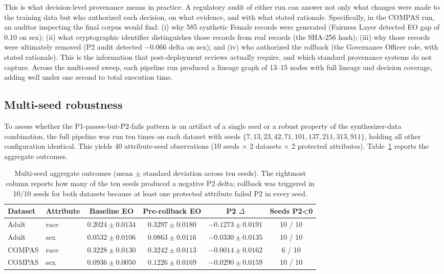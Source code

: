 \documentclass[11pt]{article}
\begin{document}
This is what decision-level provenance means in practice. A regulatory audit of either run can answer not only what changes were made to the training data but who authorized each decision, on what evidence, and with what stated rationale. Specifically, in the COMPAS run, an auditor inspecting the final corpus would find: (i) why 585 synthetic Female records were generated (Fairness Layer detected EO gap of 0.10 on sex); (ii) what cryptographic identifier distinguishes those records from real records (the SHA-256 hash); (iii) why those records were ultimately removed (P2 audit detected $-0.066$ delta on sex); and (iv) who authorized the rollback (the Governance Officer role, with stated rationale). This is the information that post-deployment reviews actually require, and which standard provenance systems do not capture. Across the multi-seed sweep, each pipeline run produced a lineage graph of 13--15 nodes with full lineage and decision coverage, adding well under one second to total execution time.

\subsection{Multi-seed robustness}
\label{subsec:multiseed}

To assess whether the P1-passes-but-P2-fails pattern is an artifact of a single seed or a robust property of the synthesizer-data combination, the full pipeline was run ten times on each dataset with seeds $\{7, 13, 23, 42, 71, 101, 137, 211, 313, 911\}$, holding all other configuration identical. This yields 40 attribute-seed observations (10 seeds $\times$ 2 datasets $\times$ 2 protected attributes). Table~\ref{tab:multiseed} reports the aggregate outcomes.

\begin{table}[h]
\centering
\small
\caption{Multi-seed aggregate outcomes (mean $\pm$ standard deviation across ten seeds). The rightmost column reports how many of the ten seeds produced a negative P2 delta; rollback was triggered in 10/10 seeds for both datasets because at least one protected attribute failed P2 in every seed.}
\label{tab:multiseed}
\begin{tabular}{llcccc}
\toprule
\textbf{Dataset} & \textbf{Attribute} & \textbf{Baseline EO} & \textbf{Pre-rollback EO} & \textbf{P2 $\Delta$} & \textbf{Seeds P2{<}0} \\
\midrule
Adult  & race & $0.2024 \pm 0.0134$ & $0.3297 \pm 0.0180$ & $-0.1273 \pm 0.0191$ & 10 / 10 \\
Adult  & sex  & $0.0532 \pm 0.0106$ & $0.0863 \pm 0.0116$ & $-0.0330 \pm 0.0135$ & 10 / 10 \\
COMPAS & race & $0.3228 \pm 0.0130$ & $0.3242 \pm 0.0113$ & $-0.0014 \pm 0.0162$ &  6 / 10 \\
COMPAS & sex  & $0.0936 \pm 0.0050$ & $0.1226 \pm 0.0169$ & $-0.0290 \pm 0.0159$ & 10 / 10 \\
\bottomrule
\end{tabular}
\end{table}
\end{document}
